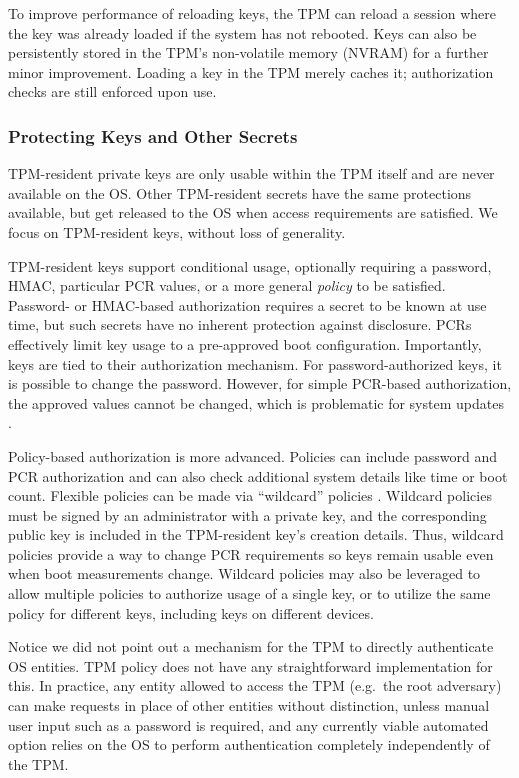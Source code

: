 \documentclass[12pt,letterpaper]{kuthesis}
\begin{document}
To improve performance of reloading keys, the TPM can reload a session where the key was already loaded if the system has not rebooted.
Keys can also be persistently stored in the TPM's non-volatile memory (NVRAM) for a further minor improvement.
Loading a key in the TPM merely caches it; authorization checks are still enforced upon use.

\subsubsection{Protecting Keys and Other Secrets}\label{sec:key-protections}
TPM-resident private keys are only usable within the TPM itself and are never available on the OS.
Other TPM-resident secrets have the same protections available, but get released to the OS when access requirements are satisfied.
We focus on TPM-resident keys, without loss of generality.

TPM-resident keys support conditional usage,
optionally requiring a password, HMAC, particular PCR values,
or a more general \emph{policy} to be satisfied.
Password- or HMAC-based authorization requires a secret to be known at use time,
but such secrets have no inherent protection against disclosure.
PCRs effectively limit key usage to a pre-approved boot configuration.
Importantly, keys are tied to their authorization mechanism.
For password-authorized keys, it is possible to change the password.
However, for simple PCR-based authorization,
the approved values cannot be changed,
which is problematic for system updates \cite{Arthur:2015:A-Practical-Guide-to-TPM-2.0-Certifying-Keys,Trusted-Computing-Group:2025:TCG-TPM-2.0-Part1-Architecture}.

Policy-based authorization is more advanced.
Policies can include password and PCR authorization and can also check additional system details like time or boot count.
Flexible policies can be made via ``wildcard'' policies \cite{Arthur:2015:A-Practical-Guide-to-TPM-2.0-Certifying-Keys}.
Wildcard policies must be signed by an administrator with a private key,
and the corresponding public key is included in the TPM-resident key's creation details.
Thus, wildcard policies provide a way to change PCR requirements
so keys remain usable even when boot measurements change.
Wildcard policies may also be leveraged to allow multiple policies to authorize usage of a single key,
or to utilize the same policy for different keys, including keys on different devices.

Notice we did not point out a mechanism for the TPM to directly authenticate OS entities.
TPM policy does not have any straightforward implementation for this.
In practice, any entity allowed to access the TPM (e.g.\ the root adversary) can make requests in place of other entities without distinction, unless manual user input such as a password is required,
and any currently viable automated option relies on the OS to perform authentication completely independently of the TPM.
\end{document}
